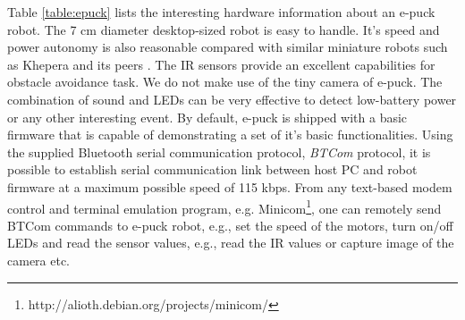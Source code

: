 Table \ref{table:epuck} lists the interesting hardware information about an e-puck robot. The 7 cm diameter desktop-sized robot is easy to handle. It's speed and power autonomy is also reasonable compared with similar miniature robots such as Khepera and its peers \cite{Mondada+2009}. The IR sensors provide an excellent capabilities for obstacle avoidance task. We do not make use of the tiny camera of e-puck. The combination of sound and LEDs can be very effective to detect low-battery power or any other interesting event. By default, e-puck is shipped with a basic firmware that is capable of demonstrating a set of it's basic functionalities. Using the supplied Bluetooth serial communication protocol,  {\em BTCom} protocol, it is possible to establish serial communication link between host PC and robot firmware at a maximum possible speed of 115 kbps. From any  text-based modem control and terminal emulation program, e.g. Minicom\footnote{http://alioth.debian.org/projects/minicom/}, one can remotely send BTCom commands to e-puck robot, e.g., set the speed of the motors, turn on/off LEDs and read the sensor values, e.g., read the IR values or capture image of the camera etc.
